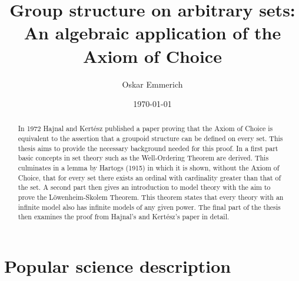 \documentclass[a4paper,12pt]{memoir}
\numberwithin{equation}{section} %
\theoremstyle{plain} %
\theoremstyle{definition} %
\theoremstyle{remark} %
\begin{document}

\author{Oskar Emmerich}

\title{Group structure on arbitrary sets:\\An algebraic application of the Axiom of Choice}

\date{\today}



\frontmatter %


\thispagestyle{empty}

\begin{abstract}
  In 1972 Hajnal and Kertész published a paper proving that the Axiom of Choice is equivalent to the assertion that a groupoid structure can be defined on every set.
  This thesis aims to provide the necessary background needed for this proof.
  In a first part basic concepts in set theory such as the Well-Ordering Theorem are derived. 
  This culminates in a lemma by Hartogs (1915) in which it is shown, without the Axiom of Choice, that for every set there exists an ordinal with cardinality greater than that of the set.
  A second part then gives an introduction to model theory with the aim to prove the Löwenheim-Skolem Theorem.
  This theorem states that every theory with an infinite model also has infinite models of any given power.
  The final part of the thesis then examines the proof from Hajnal's and Kertész's paper in detail.
\end{abstract}



\chapter*{Popular science description}




\cleardoublepage
\end{document}
